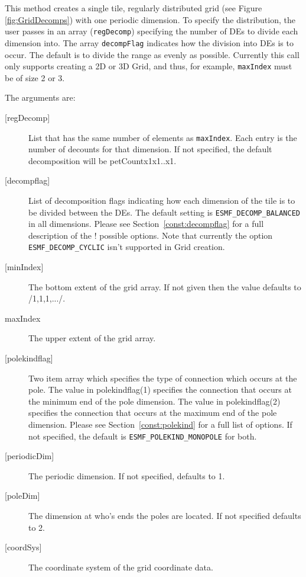   
   This method creates a single tile, regularly distributed grid
   (see Figure \ref{fig:GridDecomps}) with one periodic dimension.
   To specify the distribution, the user passes in an array
   ({\tt regDecomp}) specifying the number of DEs to divide each
   dimension into. The array {\tt decompFlag} indicates how the division into DEs is to
   occur.  The default is to divide the range as evenly as possible. Currently this call
   only supports creating a 2D or 3D Grid, and thus, for example, {\tt maxIndex} must be of size 2 or 3.
  
   The arguments are:
   \begin{description}
   \item[{[regDecomp]}]
        List that has the same number of elements as {\tt maxIndex}.
        Each entry is the number of decounts for that dimension.
        If not specified, the default decomposition will be petCountx1x1..x1.
   \item[{[decompflag]}]
        List of decomposition flags indicating how each dimension of the
        tile is to be divided between the DEs. The default setting
        is {\tt ESMF\_DECOMP\_BALANCED} in all dimensions. Please see
        Section~\ref{const:decompflag} for a full description of the
  !      possible options. Note that currently the option
        {\tt ESMF\_DECOMP\_CYCLIC} isn't supported in Grid creation.
   \item[{[minIndex]}]
        The bottom extent of the grid array. If not given then the value defaults
        to /1,1,1,.../.
   \item[maxIndex]
        The upper extent of the grid array.
   \item[{[polekindflag]}]
        Two item array which specifies the type of connection which occurs at the pole. The value in polekindflag(1)
        specifies the connection that occurs at the minimum end of the pole dimension. The value in polekindflag(2)
        specifies the connection that occurs at the maximum end of the pole dimension. Please see
        Section~\ref{const:polekind} for a full list of options. If not specified,
        the default is {\tt ESMF\_POLEKIND\_MONOPOLE} for both.
   \item[{[periodicDim]}]
        The periodic dimension. If not specified, defaults to 1.
   \item[{[poleDim]}]
        The dimension at who's ends the poles are located. If not specified defaults to 2.
   \item[{[coordSys]}]
       The coordinate system of the grid coordinate data.

\end{description}
